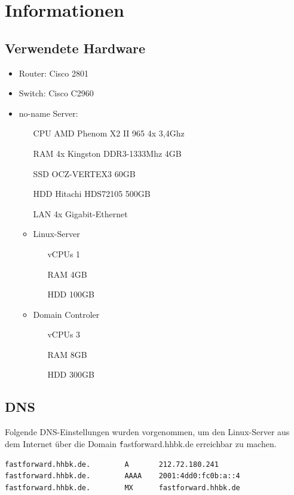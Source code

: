 \section{Informationen}

\subsection{Verwendete Hardware}

\begin{itemize}
	\item Router: Cisco 2801
	\item Switch: Cisco C2960
	\item no-name Server:
		\begin{itemize}
			\item[CPU] AMD Phenom X2 II 965 4x 3,4Ghz
			\item[RAM] 4x Kingston DDR3-1333Mhz 4GB
			\item[SSD] OCZ-VERTEX3 60GB
			\item[HDD] Hitachi HDS72105 500GB
			\item[LAN] 4x Gigabit-Ethernet
			\item Linux-Server
				\begin{itemize}
					\item[vCPUs] 1
					\item[RAM] 4GB
					\item[HDD] 100GB
				\end{itemize}
			\item Domain Controler
				\begin{itemize}
					\item[vCPUs] 3
					\item[RAM] 8GB
					\item[HDD] 300GB
				\end{itemize}
		\end{itemize}
\end{itemize}

\subsection{DNS}

Folgende DNS-Einstellungen wurden vorgenommen, um den Linux-Server aus dem Internet über die Domain {\texttt fastforward.hhbk.de} erreichbar zu machen.
\begin{lstlisting}[numbers=none]
fastforward.hhbk.de.		A		212.72.180.241
fastforward.hhbk.de.		AAAA 	2001:4dd0:fc0b:a::4
fastforward.hhbk.de.		MX		fastforward.hhbk.de
\end{lstlisting}

